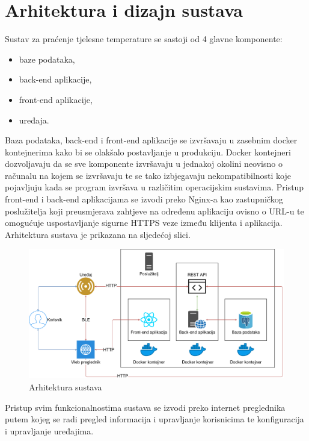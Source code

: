 \documentclass[times, utf8, diplomski]{fer}
\begin{document}
\newpage
\section{Arhitektura i dizajn sustava}
Sustav za praćenje tjelesne temperature se sastoji od 4 glavne komponente: 
\begin{itemize}
    \item baze podataka,
    \item back-end aplikacije,
    \item front-end aplikacije,
    \item uređaja.
\end{itemize}
Baza podataka, back-end i front-end aplikacije se izvršavaju u zasebnim docker kontejnerima kako bi se olakšalo postavljanje u produkciju. Docker kontejneri dozvoljavaju da se sve komponente izvršavaju u jednakoj okolini neovisno o računalu na kojem se izvršavaju te se tako izbjegavaju nekompatibilnosti koje pojavljuju kada se program izvršava u različitim operacijskim sustavima. Pristup front-end i back-end aplikacijama se izvodi preko Nginx-a kao zastupničkog poslužitelja koji preusmjerava zahtjeve na određenu aplikaciju ovisno o URL-u te omogućuje uspostavljanje sigurne HTTPS veze između klijenta i aplikacija. Arhitektura sustava je prikazana na sljedećoj slici.
\begin{figure}[H]
    \centering
    \includegraphics[width=14.5cm]{images/arh.png}
    \caption{Arhitektura sustava}
    \label{fig:architecture}
\end{figure}

Pristup svim funkcionalnostima sustava se izvodi preko internet preglednika putem kojeg se radi pregled informacija i upravljanje korisnicima te konfiguracija i upravljanje uređajima.
\end{document}
